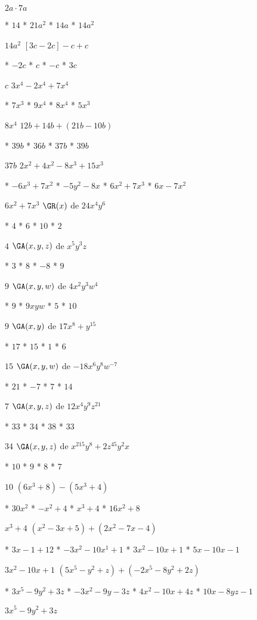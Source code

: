 $2a\cdot 7a$
\begin{enum}
	* $14$
	* $21a^2$
	* $14a$
	* $14a^2$
\end{enum}
$14a^2$
$[3c-2c]-c+c$
\begin{enum}
	* $-2c$
	* $c$
	* $-c$
	* $3c$
\end{enum}
$c$
$3x^4-2x^4+7x^4$
\begin{enum}
	* $7x^3$
	* $9x^4$
	* $8x^4$
	* $5x^3$
\end{enum}
$8x^4$
$12b+14b+(21b-10b)$
\begin{enum}
	* $39b$
	* $36b$
	* $37b$
	* $39b$
\end{enum}
$37b$
$2x^2+4x^2-8x^3+15x^3$
\begin{enum}
	* $-6x^3+7x^2$
	* $-5y^2-8x$
	* $6x^2+7x^3$
	* $6x-7x^2$
\end{enum}
$6x^2+7x^3$
$\GR(x)$ de $24x^4y^6$
\begin{enum}
	* $4$
	* $6$
	* $10$
	* $2$
\end{enum}
$4$
$\GA(x,y,z)$ de $x^5y^3z$
\begin{enum}
	* $3$
	* $8$
	* $-8$
	* $9$
\end{enum}
$9$
$\GA(x,y,w)$ de $4x^2y^3w^4$
\begin{enum}
	* $9$
	* $9xyw$
	* $5$
	* $10$
\end{enum}
$9$
$\GA(x,y)$ de $17x^8+y^{15}$
\begin{enum}
	* $17$
	* $15$
	* $1$
	* $6$
\end{enum}
$15$
$\GA(x,y,w)$ de $-18x^6y^8w^{-7}$
\begin{enum}
	* $21$
	* $-7$
	* $7$
	* $14$
\end{enum}
$7$
$\GA(x,y,z)$ de $12x^4y^9z^{21}$
\begin{enum}
	* $33$
	* $34$
	* $38$
	* $33$
\end{enum}
$34$
$\GA(x,y,z)$ de $x^215y^8+2z^45y^2x$
\begin{enum}
	* $10$
	* $9$
	* $8$
	* $7$
\end{enum}
$10$
$\left(6x^3+8\right)-\left(5x^3+4\right)$
\begin{enum}
	* $30x^2$
	* $-x^2+4$
	* $x^3+4$
	* $16x^2+8$
\end{enum}
$x^3+4$
$\left(x^2-3x+5\right)+\left(2x^2-7x-4\right)$
\begin{enum}
	* $3x-1+12$
	* $-3x^2-10x^1+1$
	* $3x^2-10x+1$
	* $5x-10x-1$
\end{enum}
$3x^2-10x+1$
$\left(5x^5-y^2+z\right)+\left(-2x^5-8y^2+2z\right)$
\begin{enum}
	* $3x^5-9y^2+3z$
	* $-3x^2-9y-3z$
	* $4x^2-10x+4z$
	* $10x-8yz-1$
\end{enum}
$3x^5-9y^2+3z$
